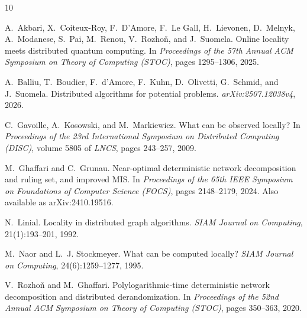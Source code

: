 \documentclass[11pt]{article}
\theoremstyle{definition}
\theoremstyle{remark}
\begin{document}
\begin{thebibliography}{10}

A.~Akbari, X.~Coiteux-Roy, F.~D'Amore, F.~Le Gall, H.~Lievonen,
D.~Melnyk, A.~Modanese, S.~Pai, M.~Renou, V.~Rozho\v{n}, and J.~Suomela.
\newblock Online locality meets distributed quantum computing.
\newblock In \emph{Proceedings of the 57th Annual ACM Symposium on Theory of
Computing (STOC)}, pages 1295--1306, 2025.

A.~Balliu, T.~Boudier, F.~d'Amore, F.~Kuhn, D.~Olivetti, G.~Schmid, and
J.~Suomela.
\newblock Distributed algorithms for potential problems.
\newblock \emph{arXiv:2507.12038v4}, 2026.

C.~Gavoille, A.~Kosowski, and M.~Markiewicz.
\newblock What can be observed locally?
\newblock In \emph{Proceedings of the 23rd International Symposium on Distributed
Computing (DISC)}, volume 5805 of \emph{LNCS}, pages 243--257, 2009.

M.~Ghaffari and C.~Grunau.
\newblock Near-optimal deterministic network decomposition and ruling set, and
improved {MIS}.
\newblock In \emph{Proceedings of the 65th IEEE Symposium on Foundations of
Computer Science (FOCS)}, pages 2148--2179, 2024.
\newblock Also available as arXiv:2410.19516.

N.~Linial.
\newblock Locality in distributed graph algorithms.
\newblock \emph{SIAM Journal on Computing}, 21(1):193--201, 1992.

M.~Naor and L.~J. Stockmeyer.
\newblock What can be computed locally?
\newblock \emph{SIAM Journal on Computing}, 24(6):1259--1277, 1995.

V.~Rozho\v{n} and M.~Ghaffari.
\newblock Polylogarithmic-time deterministic network decomposition and distributed
derandomization.
\newblock In \emph{Proceedings of the 52nd Annual ACM Symposium on Theory of
Computing (STOC)}, pages 350--363, 2020.

\end{thebibliography}
\end{document}
